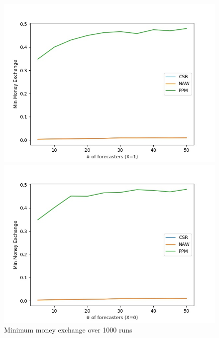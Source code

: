 \documentclass[english,10pt]{article}
\begin{document}
\begin{enumerate}
\begin{enumerate}
        	\begin{figure}[H]
        	\centering
        	\begin{minipage}{0.48\textwidth}
        	\includegraphics[width = \textwidth]{(Beta_100_100)Min_MnEx(X=1).jpg}
        	\end{minipage}
        	\begin{minipage}{0.48\textwidth}
        	\includegraphics[width = \textwidth]{(Beta_100_100)Min_MnEx(X=0).jpg}
        	\end{minipage}
        	\caption{Minimum money exchange over 1000 runs}
        	\end{figure}
	\end{enumerate}
\end{enumerate}
\end{document}
